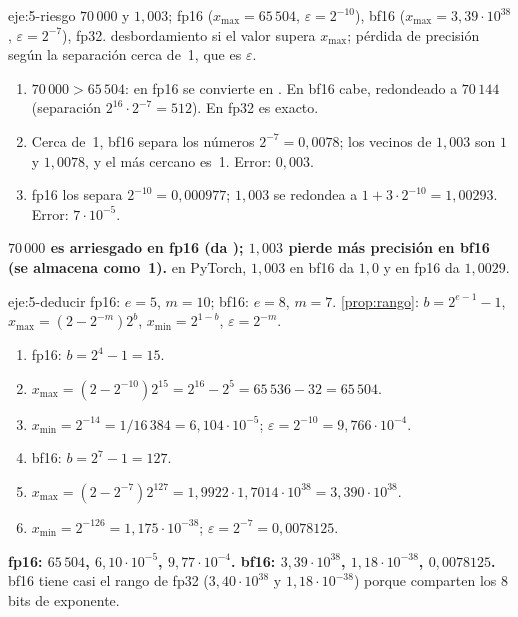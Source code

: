 \begin{solucion}{eje:5-riesgo}
\datos $70\,000$ y $1{,}003$; fp16 ($x_{\max}=65\,504$, $\varepsilon=2^{-10}$), bf16 ($x_{\max}=3{,}39\cdot 10^{38}$, $\varepsilon=2^{-7}$), fp32.
\planteamiento desbordamiento si el valor supera $x_{\max}$; pérdida de precisión según la separación cerca de~1, que es $\varepsilon$.
\pasos
\begin{enumerate}[label=\arabic*.]
  \item $70\,000>65\,504$: en fp16 se convierte en \Inf. En bf16 cabe, redondeado a $70\,144$ (separación $2^{16}\cdot 2^{-7}=512$). En fp32 es exacto.
  \item Cerca de~1, bf16 separa los números $2^{-7}=0{,}0078$; los vecinos de $1{,}003$ son $1$ y $1{,}0078$, y el más cercano es~1. Error: $0{,}003$.
  \item fp16 los separa $2^{-10}=0{,}000977$; $1{,}003$ se redondea a $1+3\cdot 2^{-10}=1{,}00293$. Error: $7\cdot 10^{-5}$.
\end{enumerate}
\resultado \textbf{$70\,000$ es arriesgado en fp16 (da \Inf); $1{,}003$ pierde más precisión en bf16 (se almacena como~1).}
\comprobacion en PyTorch, $1{,}003$ en bf16 da $1{,}0$ y en fp16 da $1{,}0029$.
\end{solucion}

\begin{solucion}{eje:5-deducir}
\datos fp16: $e=5$, $m=10$; bf16: $e=8$, $m=7$.
\planteamiento \cref{prop:rango}: $b=2^{e-1}-1$, $x_{\max}=(2-2^{-m})2^{b}$, $x_{\min}=2^{1-b}$, $\varepsilon=2^{-m}$.
\pasos
\begin{enumerate}[label=\arabic*.]
  \item fp16: $b=2^{4}-1=15$.
  \item $x_{\max}=(2-2^{-10})2^{15}=2^{16}-2^{5}=65\,536-32=65\,504$.
  \item $x_{\min}=2^{-14}=1/16\,384=6{,}104\cdot 10^{-5}$; $\varepsilon=2^{-10}=9{,}766\cdot 10^{-4}$.
  \item bf16: $b=2^{7}-1=127$.
  \item $x_{\max}=(2-2^{-7})2^{127}=1{,}9922\cdot 1{,}7014\cdot 10^{38}=3{,}390\cdot 10^{38}$.
  \item $x_{\min}=2^{-126}=1{,}175\cdot 10^{-38}$; $\varepsilon=2^{-7}=0{,}0078125$.
\end{enumerate}
\resultado \textbf{fp16: $65\,504$, $6{,}10\cdot 10^{-5}$, $9{,}77\cdot 10^{-4}$. bf16: $3{,}39\cdot 10^{38}$, $1{,}18\cdot 10^{-38}$, $0{,}0078125$.}
\comprobacion bf16 tiene casi el rango de fp32 ($3{,}40\cdot 10^{38}$ y $1{,}18\cdot 10^{-38}$) porque comparten los 8 bits de exponente.
\end{solucion}

